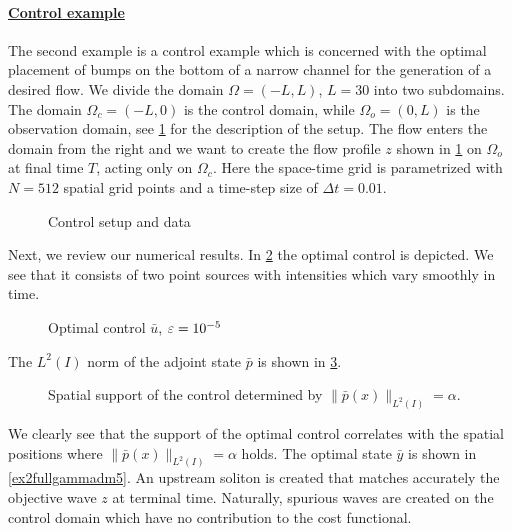 \paragraph{\underline{Control example}}
 The second example is a control example which is concerned with the optimal placement of bumps on the bottom of a narrow channel for the generation of a desired flow. We divide the domain $\Omega = (-L,L)$, $L=30$ into two subdomains. The domain $\Omega_c = (-L,0)$ is the control domain, while $\Omega_{o} = (0,L)$ is the observation domain, see \cref{controlsetup} for the description of the setup. The flow enters the domain from the right and we want to create the flow profile $z$ shown in \cref{controlsetup} on $\Omega_{o}$ at final time $T$, acting only on $\Omega_c$. Here the space-time grid is parametrized with $N = 512$ spatial grid points and a time-step size of $\Delta t = 0.01$.
\begin{figure}[htb]
\centering
{}\quad
\subfloat{}
\caption{Control setup and data}
\label{controlsetup}
\end{figure}
Next, we review our numerical results. In \cref{recoveredcontrol2} the optimal control is depicted. We see that it consists of two point sources with intensities which vary smoothly in time.
\begin{figure}[htb]
\centering
\subfloat{}\quad
\subfloat{}
\caption{Optimal control $\bar u$, $\varepsilon = 10^{-5}$}
\label{recoveredcontrol2}
\end{figure}
The $L^2(I)$ norm of the adjoint state $\bar p$ is shown in \cref{supportIP}.
\begin{figure}[htb]
\centering

\caption{Spatial support of the control determined by $\|\bar p(x)\|_{L^2(I)}=\alpha$.}
\label{supportIP}
\end{figure}
We clearly see that the support of the optimal control correlates with the spatial positions where $\|\bar p(x)\|_{L^2(I)}=\alpha$ holds. The optimal state $\bar y$ is shown in \cref{ex2fullgammadm5}. An upstream soliton is created that matches accurately the objective wave $z$ at terminal time. Naturally, spurious waves are created on the control domain which have no contribution to the cost functional.
